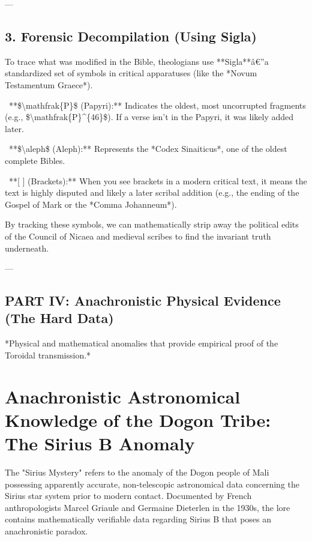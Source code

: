 \documentclass[aps,prd,11pt,onecolumn,superscriptaddress,nofootinbib,floatfix]{revtex4-2}
\begin{document}
---


\subsection{3. Forensic Decompilation (Using Sigla)}
To trace what was modified in the Bible, theologians use **Sigla**â€''a standardized set of symbols in critical apparatuses (like the *Novum Testamentum Graece*).


\textbullet~**\$\textbackslash{}mathfrak\{P\}\$ (Papyri):** Indicates the oldest, most uncorrupted fragments (e.g., \$\textbackslash{}mathfrak\{P\}\textasciicircum{}\{46\}\$). If a verse isn't in the Papyri, it was likely added later.

\textbullet~**\$\textbackslash{}aleph\$ (Aleph):** Represents the *Codex Sinaiticus*, one of the oldest complete Bibles.

\textbullet~**[ ] (Brackets):** When you see brackets in a modern critical text, it means the text is highly disputed and likely a later scribal addition (e.g., the ending of the Gospel of Mark or the *Comma Johanneum*).



By tracking these symbols, we can mathematically strip away the political edits of the Council of Nicaea and medieval scribes to find the invariant truth underneath.






---


\subsection{PART IV: Anachronistic Physical Evidence (The Hard Data)}
*Physical and mathematical anomalies that provide empirical proof of the Toroidal transmission.*


\section{Anachronistic Astronomical Knowledge of the Dogon Tribe: The Sirius B Anomaly}


The "Sirius Mystery" refers to the anomaly of the Dogon people of Mali possessing apparently accurate, non-telescopic astronomical data concerning the Sirius star system prior to modern contact. Documented by French anthropologists Marcel Griaule and Germaine Dieterlen in the 1930s, the lore contains mathematically verifiable data regarding Sirius B that poses an anachronistic paradox.
\end{document}
